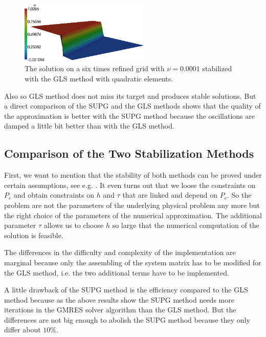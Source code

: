 \documentclass[a4paper, 11pt, twoside]{article}
\begin{document}
\begin{figure}[htbp]
\begin{center}
\includegraphics[width=0.55\textwidth]{fig/GLS_6_0,0001_quad.png}
\caption{The solution on a six times refined grid with $\nu = 0.0001$ stabilized with the GLS method with quadratic elements.}
\label{GLSreflevel6_nu0,0001}
\end{center}
\end{figure}

Also so GLS method does not miss its target and produces stable solutions. But a direct comparison of the SUPG and the GLS methods shows that the quality of the approximation is better with the SUPG method because the oscillations are damped a little bit better than with the GLS method.

\subsection{Comparison of the Two Stabilization Methods}\label{comparison}

First, we want to mention that the stability of both methods can be proved under certain assumptions, see e.g. \cite{Quarteroni}. It even turns out that we loose the constraints on $P_{e}$ and obtain constraints on $h$ and $\tau$ that are linked and depend on $P_{e}$. So the problem are not the parameters of the underlying physical problem any more but the right choice of the parameters of the numerical approximation. The additional parameter $\tau$ allows us to choose $h$ so large that the numerical computation of the solution is feasible.

The differences in the difficulty and complexity of the implementation are marginal because only the assembling of the system matrix has to be modified for the GLS method, i.e. the two additional terms have to be implemented.

A little drawback of the SUPG method is the efficiency compared to the GLS method because as the above results show the SUPG method needs more iterations in the GMRES solver algorithm than the GLS method. But the differences are not big enough to abolish the SUPG method because they only differ about $10 \%$.

\newpage
\appendix



\printindex
\end{document}
